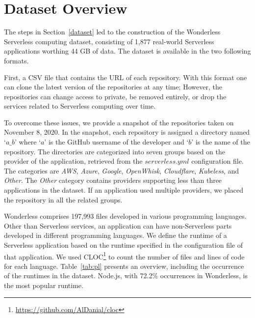 
\section{Dataset Overview}
\label{schema}

The steps in Section~\ref{dataset} led to the construction of the 
Wonderless Serverless computing dataset, consisting of 1,877
real-world Serverless applications worthing 44 GB of data. 
The dataset is available in the two following formats.

First, a CSV file that contains the URL of each repository. 
With this format one can clone the latest version of the repositories at any time; 
However, the repositories can change access to private, 
be removed entirely, or drop the services related to Serverless computing 
over time. 

To overcome these issues, we provide a snapshot of the 
repositories taken on November 8, 2020. 
In the snapshot, each repository is assigned a directory named `$a\_b$' 
where `$a$' is the GitHub username of the developer and `$b$' is the name of the repository. 
The directories are categorized into seven groups based on the provider of the application, 
retrieved from the $serverless.yml$ configuration file. 
The categories are \emph{AWS}, \emph{Azure}, \emph{Google}, \emph{OpenWhisk}, 
\emph{Cloudflare}, \emph{Kubeless}, 
and \emph{Other}. The \emph{Other} category contains providers supporting less than three 
applications in the dataset. If an application used multiple providers, we placed the repository in 
all the related groups. 

Wonderless comprises 197,993 files developed in various programming languages. 
Other than Serverless services, an application can have non-Serverless parts 
developed in different programming languages. We define the runtime of a 
Serverless application based on the runtime specified in the configuration file of that application.
We used CLOC\footnote{\url{https://github.com/AlDanial/cloc}} to count the number of files and 
lines of code for each language. Table~\ref{tab:pl} presents an overview, 
including the occurrence of the runtimes in the dataset. 
Node.js, with 72.2\% occurrences in Wonderless, is the most popular runtime.

